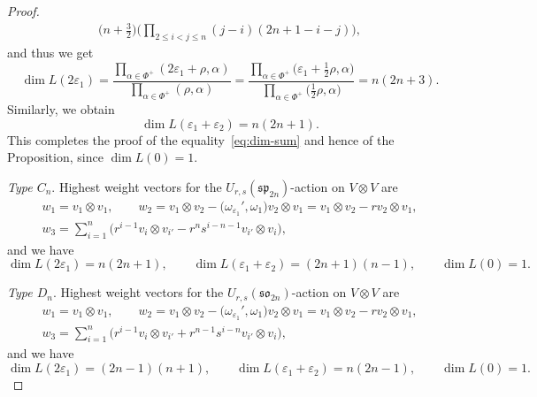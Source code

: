 \documentclass[pdftex]{sigma}
\numberwithin{equation}{section}
\newcommand{\sso}{\mathfrak{so}}
\newcommand{\ssp}{\mathfrak{sp}}
\begin{document}
\begin{proof}
\begin{gather*}
 \bigl( n + \tfrac{3}{2} \bigr) \biggl( \prod_{2 \le i < j \le n}(j - i)(2n + 1 - i - j) \biggr),
\end{gather*}
and thus we get
\begin{displaymath}
 \dim{L(2\varepsilon_{1})} =
  \frac{\prod_{\alpha \in \Phi^{+}}(2\varepsilon_{1} + \rho,\alpha)}{\prod_{\alpha \in \Phi^{+}}(\rho,\alpha)} =
  \frac{\prod_{\alpha \in \Phi^{+}}\bigl(\varepsilon_{1} + \tfrac{1}{2}\rho,\alpha\bigr)}{\prod_{\alpha \in \Phi^{+}}\bigl(\tfrac{1}{2}\rho,\alpha\bigr)} =
  n(2n + 3).
\end{displaymath}
Similarly, we obtain
\begin{displaymath}
 \dim{L(\varepsilon_{1} + \varepsilon_{2})} = n(2n + 1).
\end{displaymath}
This completes the proof of the equality~\eqref{eq:dim-sum} and hence of the Proposition, since $\dim{L(0)} = 1$.


\textit{Type $C_n$}.
Highest weight vectors for the $U_{r,s}(\ssp_{2n})$-action on $V\otimes V$ are
\begin{gather}
 w_{1} = v_{1} \otimes v_{1},\qquad
 w_{2} = v_{1} \otimes v_{2} - \bigl(\omega_{\varepsilon_{1}}',\omega_{1}\bigr)v_{2} \otimes v_{1} =
 v_{1} \otimes v_{2} - r v_{2} \otimes v_{1} , \nonumber\\
 w_{3} = \sum_{i = 1}^{n}\bigl(r^{i - 1}v_{i} \otimes v_{i'} - r^{n}s^{i - n- 1}v_{i'} \otimes v_{i}\bigr),\label{eq:C_hwv}
\end{gather}
and we have
\[
 \dim{L(2\varepsilon_{1})} = n(2n + 1) , \qquad
 \dim{L(\varepsilon_{1} + \varepsilon_{2})} = (2n + 1)(n - 1), \qquad \dim{L(0)}=1 .
\]


\textit{Type $D_n$}.
Highest weight vectors for the $U_{r,s}(\sso_{2n})$-action on $V\otimes V$ are
\begin{gather}
 w_{1} = v_{1} \otimes v_{1},\qquad
 w_{2} = v_{1} \otimes v_{2} - \bigl(\omega_{\varepsilon_{1}}',\omega_{1}\bigr)v_{2} \otimes v_{1} =
 v_{1} \otimes v_{2} - r v_{2} \otimes v_{1}, \nonumber\\
 w_{3} = \sum_{i = 1}^{n}\bigl(r^{i - 1}v_{i} \otimes v_{i'} + r^{n - 1}s^{i - n}v_{i'} \otimes v_{i}\bigr),\label{eq:D_hwv}
\end{gather}
and we have
\begin{displaymath}
 \dim{L(2\varepsilon_{1})} = (2n - 1)(n + 1), \qquad
 \dim{L(\varepsilon_{1} + \varepsilon_{2})} = n(2n - 1), \qquad \dim{L(0)}=1 . \tag*{\qed}
\end{displaymath}
\renewcommand{\qed}{}
\end{proof}
\end{document}
